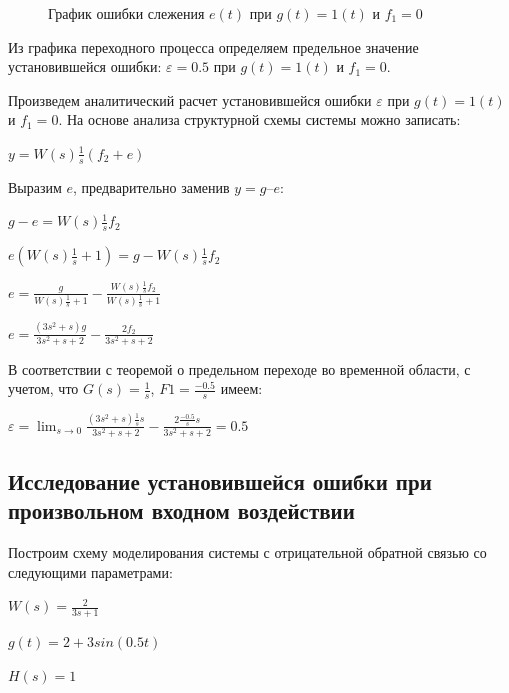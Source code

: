 \documentclass[a4paper, 11pt]{article}
\begin{document}
\begin{figure}[h!]
\caption{График ошибки слежения $e(t)$  при $g(t)=1(t)$  и $f_1=0$}
\label{ris:image}
\end{figure}

\par 
	Из графика переходного процесса определяем предельное значение установившейся ошибки: $\varepsilon = 0.5$ при $g(t)=1(t)$  и $f_1=0$.
\par 
Произведем аналитический расчет установившейся ошибки $\varepsilon$ при $g(t)=1(t)$  и $f_1=0$. На основе анализа структурной схемы системы можно записать:
\newpage
\par 
$\displaystyle y=W(s)\frac{1}{s}(f_2+e)$
\par 
Выразим $e$, предварительно заменив $y = g – e$:
\par 
$\displaystyle g-e=W(s)\frac{1}{s}f_2$
\par 
$\displaystyle e(W(s)\frac{1}{s}+1)=g-W(s)\frac{1}{s}f_2$
\par 
$e=\displaystyle\frac{g}{W(s)\frac{1}{s}+1}-\frac{W(s)\frac{1}{s}f_2}{W(s)\frac{1}{s}+1}$
\par 
$e=\displaystyle\frac{(3s^2+s)g}{3s^2+s+2}-\frac{2f_2}{3s^2+s+2}$
\par 
	В соответствии с теоремой о предельном переходе во временной области, с учетом, что $\displaystyle G(s) = \frac{1}{s}$, $\displaystyle F1= \frac{-0.5}{s}$ имеем:
\par 
$\varepsilon=\lim_{s\to 0}\displaystyle\frac{(3s^2+s)\frac{1}{s}s}{3s^2+s+2}-\frac{2\frac{-0.5}{s}s}{3s^2+s+2}=0.5$

\newpage
\begin{center}
\section{Исследование установившейся ошибки при произвольном входном воздействии}
\end{center}
\par 
	Построим схему моделирования системы с отрицательной обратной связью со следующими параметрами:
\par 
$\displaystyle W(s)=  \frac{2}{3s+1}$
\par 
$\displaystyle g(t)=2+3sin(0.5t)$
\par 
$H(s)=1$
\end{document}
